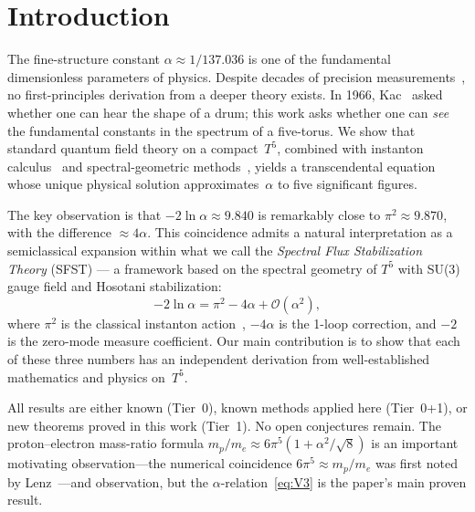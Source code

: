 \documentclass[11pt,a4paper]{article}
\theoremstyle{definition}
\theoremstyle{remark}
\begin{document}
\section{Introduction}
\label{sec:intro}

The fine-structure constant $\alpha\approx 1/137.036$ is one of the
fundamental dimensionless parameters of physics.  Despite decades of
precision measurements~\cite{Morel2020,Parker2018}, no first-principles
derivation from a deeper theory exists.  In 1966,
Kac~\cite{Kac1966} asked whether one can hear the shape of a drum;
this work asks whether one can \emph{see} the fundamental constants in
the spectrum of a five-torus. We show that standard quantum field
theory on a compact~$T^5$, combined with instanton
calculus~\cite{Belavin1975,tHooft1976} and spectral-geometric
methods~\cite{ChamseddineConnes1997,Gilkey1984,AtiyahSinger1968},
yields a transcendental equation whose unique physical solution
approximates~$\alpha$ to five significant figures.

The key observation is that $-2\ln\alpha\approx 9.840$ is remarkably
close to $\pi^2\approx 9.870$, with the difference $\approx 4\alpha$.
This coincidence admits a natural interpretation as a semiclassical
expansion within what we call the \emph{Spectral Flux Stabilization~\cite{Appelquist1987}
Theory} (SFST) --- a framework based on the spectral geometry of
$T^5$ with SU(3) gauge field and Hosotani stabilization:
\begin{equation}\label{eq:V3}
  -2\ln\alpha = \pi^2 - 4\alpha + \mathcal{O}(\alpha^2),
\end{equation}
where $\pi^2$ is the classical instanton action~\cite{Belavin1975}, $-4\alpha$ is the
1-loop correction, and $-2$ is the zero-mode measure coefficient.  Our
main contribution is to show that each of these three numbers has an
independent derivation from well-established mathematics and physics
on~$T^5$.

All results are either known (Tier~0), known methods applied here (Tier~0+1),
or new theorems proved in this work (Tier~1).  No open conjectures remain.  The proton--electron mass-ratio formula
$m_p/m_e\approx 6\pi^5(1+\alpha^2/\sqrt{8})$ is an important motivating
observation---the numerical coincidence $6\pi^5\approx m_p/m_e$ was
first noted by Lenz~\cite{Lenz1951}---and observation, but the
$\alpha$-relation~\eqref{eq:V3} is the paper's main proven result.
\end{document}
